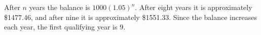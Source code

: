 After $n$ years the balance is $1000(1.05)^n$. After eight years it is approximately \$1477.46, and after nine it is approximately \$1551.33. Since the balance increases each year, the first qualifying year is $\boxed{9}$.
